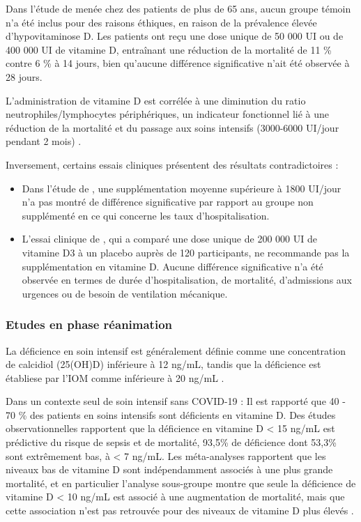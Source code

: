 \documentclass[
  a4paper,
  DIV=11,
  numbers=noendperiod,
  listof=totoc]{scrreprt}
\begin{document}
Dans l'étude de \textcite{Annweiler.2022} menée chez des patients de
plus de 65 ans, aucun groupe témoin n'a été inclus pour des raisons
éthiques, en raison de la prévalence élevée d'hypovitaminose D. Les
patients ont reçu une dose unique de 50 000 UI ou de 400 000 UI de
vitamine D, entraînant une réduction de la mortalité de 11 \% contre 6
\% à 14 jours, bien qu'aucune différence significative n'ait été
observée à 28 jours.

L'administration de vitamine D est corrélée à une diminution du ratio
neutrophiles/lymphocytes périphériques, un indicateur fonctionnel lié à
une réduction de la mortalité et du passage aux soins intensifs
(3000-6000 UI/jour pendant 2 mois) \autocite{Maghbooli.2021}.

Inversement, certains essais cliniques présentent des résultats
contradictoires :

\begin{itemize}
\item
  Dans l'étude de \textcite{Cereda.2021}, une supplémentation moyenne
  supérieure à 1800 UI/jour n'a pas montré de différence significative
  par rapport au groupe non supplémenté en ce qui concerne les taux
  d'hospitalisation.
\item
  L'essai clinique de \textcite{Murai.2021}, qui a comparé une dose
  unique de 200 000 UI de vitamine D3 à un placebo auprès de 120
  participants, ne recommande pas la supplémentation en vitamine D.
  Aucune différence significative n'a été observée en termes de durée
  d'hospitalisation, de mortalité, d'admissions aux urgences ou de
  besoin de ventilation mécanique.
\end{itemize}

\subsubsection{Etudes en phase
réanimation}\label{etudes-en-phase-ruxe9animation}

La déficience en soin intensif est généralement définie comme une
concentration de calcidiol (25(OH)D) inférieure à 12 ng/mL, tandis que
la déficience est établiese par l'\ac{IOM} comme inférieure à 20 ng/mL
\autocite{Cutuli.2024}.

Dans un contexte seul de soin intensif sans COVID-19 : Il est rapporté
que 40 - 70 \% des patients en soins intensifs sont déficients en
vitamine D. Des études observationnelles rapportent que la déficience en
vitamine D \textless{} 15 ng/mL est prédictive du risque de sepsis et de
mortalité, 93,5\% de déficience dont 53,3\% sont extrêmement bas, à
\textless{} 7 ng/mL. Les méta-analyses rapportent que les niveaux bas de
vitamine D sont indépendamment associés à une plus grande mortalité, et
en particulier l'analyse sous-groupe montre que seule la déficience de
vitamine D \textless{} 10 ng/mL est associé à une augmentation de
mortalité, mais que cette association n'est pas retrouvée pour des
niveaux de vitamine D plus élevés \autocite{Cutuli.2024}.
\end{document}
